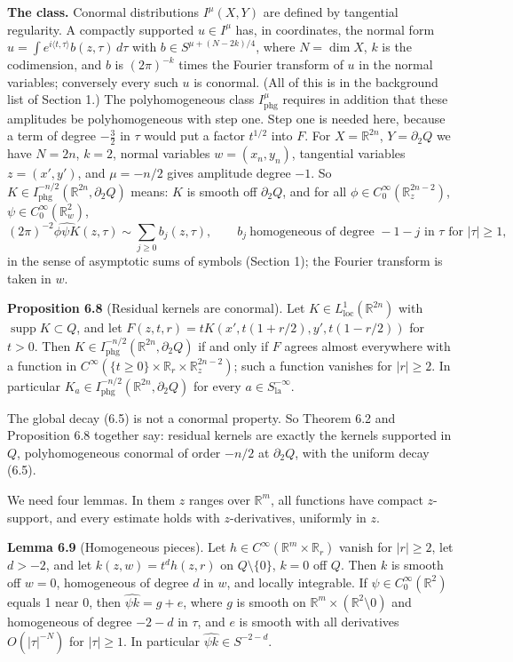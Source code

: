 \documentclass[
  11pt,
]{article}
\begin{document}
\textbf{The class.} Conormal distributions \(I^\mu(X,Y)\) are defined by
tangential regularity. A compactly supported \(u\in I^\mu\) has, in
coordinates, the normal form
\(u=\int e^{i\langle t,\tau\rangle}b(z,\tau)\,d\tau\) with
\(b\in S^{\mu+(N-2k)/4}\), where \(N=\dim X\), \(k\) is the codimension,
and \(b\) is \((2\pi)^{-k}\) times the Fourier transform of \(u\) in the
normal variables; conversely every such \(u\) is conormal. (All of this
is in the background list of Section 1.) The polyhomogeneous class
\(I^\mu_{\mathrm{phg}}\) requires in addition that these amplitudes be
polyhomogeneous with step one. Step one is needed here, because a term
of degree \(-\tfrac32\) in \(\tau\) would put a factor \(t^{1/2}\) into
\(F\). For \(X=\mathbb R^{2n}\), \(Y=\partial_2Q\) we have \(N=2n\),
\(k=2\), normal variables \(w=(x_n,y_n)\), tangential variables
\(z=(x',y')\), and \(\mu=-n/2\) gives amplitude degree \(-1\). So
\(K\in I^{-n/2}_{\mathrm{phg}}(\mathbb R^{2n},\partial_2Q)\) means:
\(K\) is smooth off \(\partial_2Q\), and for all
\(\phi\in C_0^\infty(\mathbb R^{2n-2}_z)\),
\(\psi\in C_0^\infty(\mathbb R^2_w)\), \[
(2\pi)^{-2}\widehat{\phi\psi K}(z,\tau)\sim\sum_{j\geq0}b_j(z,\tau),\qquad b_j\ \text{homogeneous of degree }-1-j\text{ in }\tau\text{ for }|\tau|\geq1,
\tag{6.11}
\] in the sense of asymptotic sums of symbols (Section 1); the Fourier
transform is taken in \(w\).

\textbf{Proposition 6.8} (Residual kernels are conormal). Let
\(K\in L^1_{\mathrm{loc}}(\mathbb R^{2n})\) with
\(\operatorname{supp}K\subset Q\), and let
\(F(z,t,r)=tK(x',t(1+r/2),y',t(1-r/2))\) for \(t>0\). Then
\(K\in I^{-n/2}_{\mathrm{phg}}(\mathbb R^{2n},\partial_2Q)\) if and only
if \(F\) agrees almost everywhere with a function in
\(C^\infty(\{t\geq0\}\times\mathbb R_r\times\mathbb R^{2n-2}_z)\); such
a function vanishes for \(|r|\geq2\). In particular
\(K_a\in I^{-n/2}_{\mathrm{phg}}(\mathbb R^{2n},\partial_2Q)\) for every
\(a\in S^{-\infty}_{\mathrm{la}}\).

The global decay (6.5) is not a conormal property. So Theorem 6.2 and
Proposition 6.8 together say: residual kernels are exactly the kernels
supported in \(Q\), polyhomogeneous conormal of order \(-n/2\) at
\(\partial_2Q\), with the uniform decay (6.5).

We need four lemmas. In them \(z\) ranges over \(\mathbb R^{m}\), all
functions have compact \(z\)-support, and every estimate holds with
\(z\)-derivatives, uniformly in \(z\).

\textbf{Lemma 6.9} (Homogeneous pieces). Let
\(h\in C^\infty(\mathbb R^m\times\mathbb R_r)\) vanish for \(|r|\geq2\),
let \(d>-2\), and let \(k(z,w)=t^dh(z,r)\) on \(Q\setminus\{0\}\),
\(k=0\) off \(Q\). Then \(k\) is smooth off \(w=0\), homogeneous of
degree \(d\) in \(w\), and locally integrable. If
\(\psi\in C_0^\infty(\mathbb R^2)\) equals 1 near 0, then
\(\widehat{\psi k}=g+e\), where \(g\) is smooth on
\(\mathbb R^m\times(\mathbb R^2\setminus0)\) and homogeneous of degree
\(-2-d\) in \(\tau\), and \(e\) is smooth with all derivatives
\(O(|\tau|^{-N})\) for \(|\tau|\geq1\). In particular
\(\widehat{\psi k}\in S^{-2-d}\).
\end{document}
